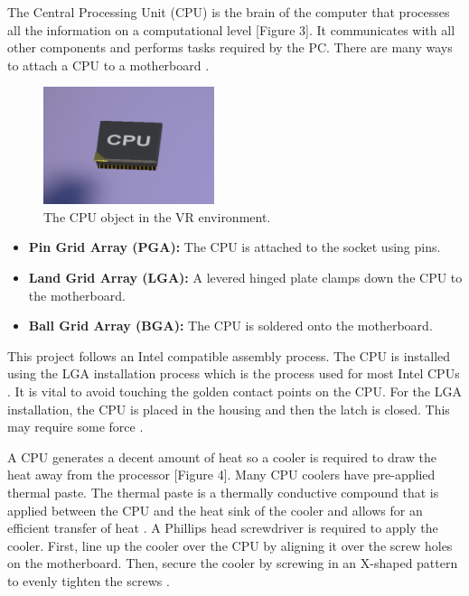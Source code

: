 \documentclass[10pt,twocolumn]{article}
\begin{document}
\par The Central Processing Unit (CPU) is the brain of the computer that processes all the information on a computational level [Figure 3]. It communicates with all other components and performs tasks required by the PC. There are many ways to attach a CPU to a motherboard \cite{Fisher2021EverythingYouNeed}.

\begin{figure}
    \centering
    \includegraphics[width=5cm]{images/CPU1.png}
    \caption{The CPU object in the VR environment.}
\end{figure}

\begin{itemize}
    \item \textbf{Pin Grid Array (PGA):}  The CPU is attached to the socket using pins.
    \item \textbf{Land Grid Array (LGA):} A levered hinged plate clamps down the CPU to the motherboard. 
    \item \textbf{Ball Grid Array (BGA):} The CPU is soldered onto the motherboard. 
\end{itemize}

\par This project follows an Intel compatible assembly process. The CPU is installed using the LGA installation process which is the process used for most Intel CPUs \cite{GlobalAmerican2022TypesOfCPU}. It is vital to avoid touching the golden contact points on the CPU. For the LGA installation, the CPU is placed in the housing and then the latch is closed. This may require some force \cite{Sample2021HowToAssemble}. 

\par A CPU generates a decent amount of heat so a cooler is required to draw the heat away from the processor [Figure 4]. Many CPU coolers have pre-applied thermal paste. The thermal paste is a thermally conductive compound that is applied between the CPU and the heat sink of the cooler and allows for an efficient transfer of heat \cite{Intel2023HowToApply}. A Phillips head screwdriver is required to apply the cooler. First, line up the cooler over the CPU by aligning it over the screw holes on the motherboard. Then, secure the cooler by screwing in an X-shaped pattern to evenly tighten the screws \cite{Fisher2021EverythingYouNeed}. 
\end{document}
